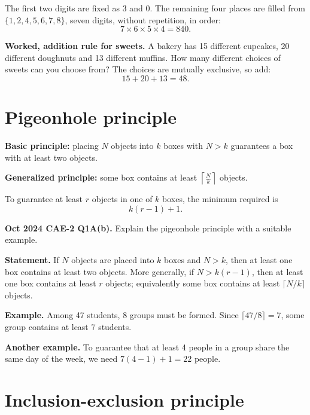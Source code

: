 \documentclass[11pt,a4paper]{article}
\begin{document}
\begin{solbox}
The first two digits are fixed as 3 and 0. The remaining four places are filled from $\{1,2,4,5,6,7,8\}$, seven digits, without repetition, in order:
\[
7\times6\times5\times4=\boxed{840}.
\]
\end{solbox}

\begin{exambox}
\textbf{Worked, addition rule for sweets.} A bakery has 15 different cupcakes, 20 different doughnuts and 13 different muffins. How many different choices of sweets can you choose from? The choices are mutually exclusive, so add:
\[
15+20+13=\boxed{48}.
\]
\end{exambox}

\section{Pigeonhole principle}

\textbf{Basic principle:} placing $N$ objects into $k$ boxes with $N>k$ guarantees a box with at least two objects.

\textbf{Generalized principle:} some box contains at least $\left\lceil \frac{N}{k}\right\rceil$ objects.

To guarantee at least $r$ objects in one of $k$ boxes, the minimum required is
\[
k(r-1)+1.
\]

\begin{pyqbox}
\textbf{Oct 2024 CAE-2 Q1A(b).} Explain the pigeonhole principle with a suitable example.
\end{pyqbox}

\begin{solbox}
\textbf{Statement.} If $N$ objects are placed into $k$ boxes and $N>k$, then at least one box contains at least two objects. More generally, if $N>k(r-1)$, then at least one box contains at least $r$ objects; equivalently some box contains at least $\lceil N/k\rceil$ objects.

\textbf{Example.} Among 47 students, 8 groups must be formed. Since $\lceil47/8\rceil=7$, some group contains at least 7 students.

\textbf{Another example.} To guarantee that at least 4 people in a group share the same day of the week, we need $7(4-1)+1=22$ people.
\end{solbox}

\section{Inclusion-exclusion principle}
\end{document}
